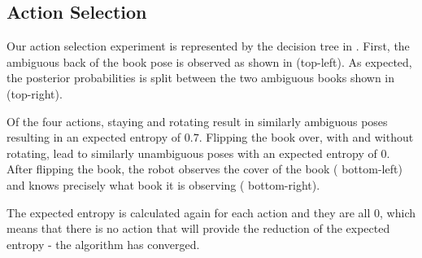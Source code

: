     \subsection{Action Selection}
	Our action selection experiment is represented by the decision tree in .    
	First, the ambiguous back of the book pose is observed as shown in  (top-left). As expected, the posterior probabilities is split between the two ambiguous books shown in  (top-right).    

 Of the four actions, staying and rotating result in similarly ambiguous poses resulting in an expected entropy of $0.7$. Flipping the book over, with and without rotating, lead to similarly unambiguous poses with an expected entropy of $0$. After flipping the book, the robot observes the cover of the book ( bottom-left) and knows precisely what book it is observing ( bottom-right).

        The expected entropy is calculated again for each action and they are all $0$, which means that there is no action that will provide the reduction of the expected entropy - the algorithm has converged. %
    
    

        

